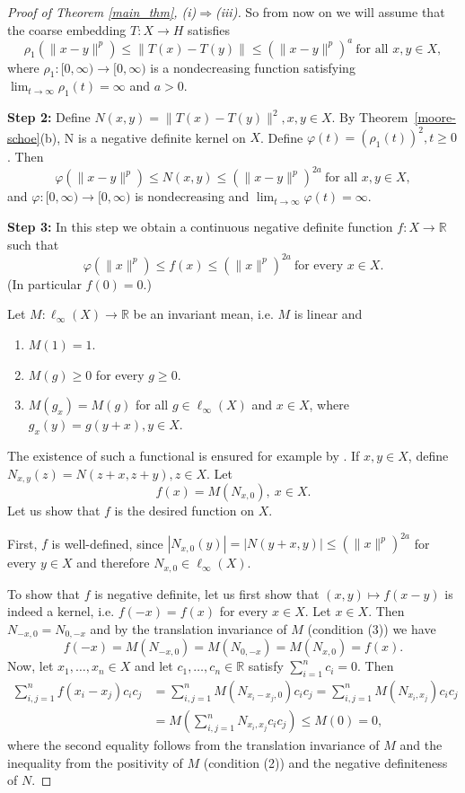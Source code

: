 \documentclass[a4paper,oneside]{amsart}
\theoremstyle{definition}
\begin{document}
\begin{proof}[Proof of Theorem \ref{main_thm}, (i)$\Rightarrow$(iii)]
So from now on we will assume that the coarse embedding $T:X\to H$ satisfies
$$\rho_1(\|x-y\|^p)\leq\|T(x)-T(y)\|\leq(\|x-y\|^p)^a\ \text{for all }x,y\in X,$$
where $\rho_1:[0,\infty)\to[0,\infty)$ is a nondecreasing function satisfying $\lim_{t\to\infty}\rho_1(t)=\infty$ and $a>0$.

\textbf{Step 2:} Define $N(x,y)=\|T(x)-T(y)\|^2,x,y\in X$. By Theorem~\ref{moore-schoe}(b), N is a negative definite kernel on $X$. Define $\varphi(t)=(\rho_1(t))^2,t\geq0$. Then 
$$\varphi(\|x-y\|^p)\leq N(x,y)\leq(\|x-y\|^p)^{2a}\ \text{for all }x,y\in X,$$
and $\varphi:[0,\infty)\to[0,\infty)$ is nondecreasing and $\lim_{t\to\infty}\varphi(t)=\infty$.

\textbf{Step 3:} In this step we obtain a continuous negative definite function $f:X\to{\mathbb{R}}$ such that
$$\varphi(\|x\|^p)\leq f(x)\leq(\|x\|^p)^{2a}\ \text{for every }x\in X.$$
(In particular $f(0)=0$.)

Let $M:\ell_\infty(X)\to{\mathbb{R}}$ be an invariant mean, i.e. $M$ is linear and
\begin{enumerate}
\item $M(1)=1$.
\item $M(g)\geq0$ for every $g\geq0$.
\item $M(g_x)=M(g)$ for all $g\in\ell_\infty(X)$ and $x\in X$, where $g_x(y)=g(y+x),y\in X$.
\end{enumerate}
The existence of such a functional is ensured for example by \cite[Theorem C.1]{bl}. If $x,y\in X$, define $N_{x,y}(z)=N(z+x,z+y),z\in X$. Let
$$f(x)=M(N_{x,0}),\ x\in X.$$
Let us show that $f$ is the desired function on $X$.

First, $f$ is well-defined, since $|N_{x,0}(y)|=|N(y+x,y)|\leq(\|x\|^p)^{2a}$ for every $y\in X$ and therefore $N_{x,0}\in\ell_\infty(X)$.

To show that $f$ is negative definite, let us first show that $(x,y)\mapsto f(x-y)$ is indeed a kernel, i.e. $f(-x)=f(x)$ for every $x\in X$. Let $x\in X$. Then $N_{-x,0}=N_{0,-x}$ and by the translation invariance of $M$ (condition (3)) we have
$$f(-x)=M(N_{-x,0})=M(N_{0,-x})=M(N_{x,0})=f(x).$$
Now, let $x_1,\dots,x_n\in X$ and let $c_1,\dots,c_n\in{\mathbb{R}}$ satisfy $\sum_{i=1}^nc_i=0$. Then
\begin{align*}
\sum_{i,j=1}^nf(x_i-x_j)c_ic_j&=\sum_{i,j=1}^nM(N_{x_i-x_j,0})c_ic_j=\sum_{i,j=1}^nM(N_{x_i,x_j})c_ic_j\\
&=M\left(\sum_{i,j=1}^nN_{x_i,x_j}c_ic_j\right)\leq M(0)=0,
\end{align*}
where the second equality follows from the translation invariance of $M$ and the inequality from the positivity of $M$ (condition (2)) and the negative definiteness of $N$.


\end{proof}
\end{document}
